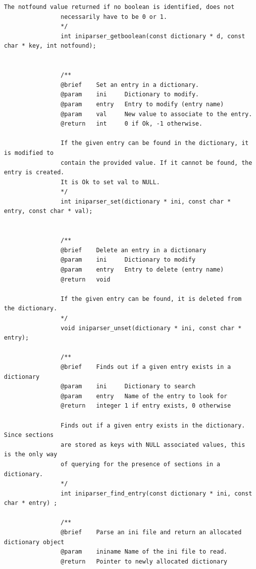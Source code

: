 \documentclass{article}
\begin{document}
\begin{Verbatim}[gobble=8]
                The notfound value returned if no boolean is identified, does not
                necessarily have to be 0 or 1.
                */
                int iniparser_getboolean(const dictionary * d, const char * key, int notfound);
                
                
                /**
                @brief    Set an entry in a dictionary.
                @param    ini     Dictionary to modify.
                @param    entry   Entry to modify (entry name)
                @param    val     New value to associate to the entry.
                @return   int     0 if Ok, -1 otherwise.
                
                If the given entry can be found in the dictionary, it is modified to
                contain the provided value. If it cannot be found, the entry is created.
                It is Ok to set val to NULL.
                */
                int iniparser_set(dictionary * ini, const char * entry, const char * val);
                
                
                /**
                @brief    Delete an entry in a dictionary
                @param    ini     Dictionary to modify
                @param    entry   Entry to delete (entry name)
                @return   void
                
                If the given entry can be found, it is deleted from the dictionary.
                */
                void iniparser_unset(dictionary * ini, const char * entry);
                
                /**
                @brief    Finds out if a given entry exists in a dictionary
                @param    ini     Dictionary to search
                @param    entry   Name of the entry to look for
                @return   integer 1 if entry exists, 0 otherwise
                
                Finds out if a given entry exists in the dictionary. Since sections
                are stored as keys with NULL associated values, this is the only way
                of querying for the presence of sections in a dictionary.
                */
                int iniparser_find_entry(const dictionary * ini, const char * entry) ;
                
                /**
                @brief    Parse an ini file and return an allocated dictionary object
                @param    ininame Name of the ini file to read.
                @return   Pointer to newly allocated dictionary
                

\end{Verbatim}
\end{document}
